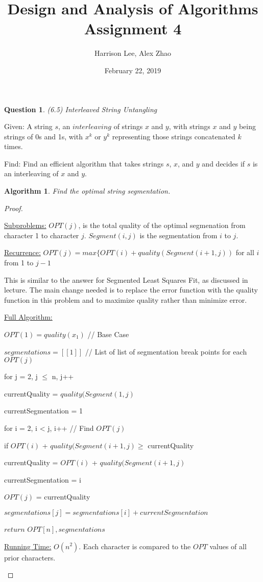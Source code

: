 \documentclass[11pt, oneside]{article}   	%
\title {Design and Analysis of Algorithms Assignment 4}
\author{Harrison Lee, Alex Zhao}
\date{February 22, 2019}
\newtheorem{Question}{Question}
\newtheorem{Algorithm}{Algorithm}
\begin{document}
\maketitle

\begin{Question} (6.5) Interleaved String Untangling
\end{Question}

\noindent Given: A string $s$, an $interleaving$ of strings $x$ and $y$, with strings $x$ and $y$ being strings of 0s and 1s, with $x^k$ or $y^k$ representing those strings concatenated $k$ times.

\noindent Find: Find an efficient algorithm that takes strings $s$, $x$, and $y$ and decides if $s$ is an interleaving of $x$ and $y$. \\

\begin{Algorithm}
Find the optimal string segmentation.
\end{Algorithm}

\begin{proof}
\begin{description}

\underline{Subproblems:} $OPT(j)$, is the total quality of the optimal segmenation from character 1 to character $j$. $Segment(i, j)$ is the segmentation from $i$ to $j$.

\underline{Recurrence:} $OPT(j) = max \{OPT(i) + quality(Segment(i+1, j))$ for all $i$ from 1 to $j-1$

This is similar to the answer for Segmented Least Squares Fit, as discussed in lecture. The main change needed is to replace the error function with the quality function in this problem and to maximize quality rather than minimize error.

\underline{Full Algorithm:}

$OPT(1) = quality(x_1)$    \quad // Base Case

$segmentations = [[1]]$	 \quad // List of list of segmentation break points for each $OPT(j)$

for j = 2, j $\leq$ n, j++

	\quad currentQuality = $quality(Segment(1, j)$

	\quad currentSegmentation = 1

	\quad for i = 2, i < j, i++ \quad // Find $OPT(j)$

	\quad \quad if $OPT(i)$ + $quality(Segment(i+1, j) \geq$  currentQuality

	\quad \quad \quad currentQuality = $OPT(i)$ + $quality(Segment(i+1, j)$

	\quad \quad \quad currentSegmentation = i

	\quad $OPT(j)$ = currentQuality

	\quad $segmentations[j] = segmentations[i] + currentSegmentation$

$return$ $OPT[n], segmentations$

\underline{Running Time:} $O(n^2)$. Each character is compared to the $OPT$ values of all prior characters.

\end{description}
\end{proof}
\end{document}
